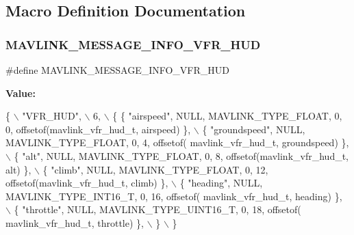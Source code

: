 \subsection{Macro Definition Documentation}
\mbox{\label{mavlink__msg__vfr__hud_8h_a8a7cc6c6a8cd28510b200a8cb401501c}} 
\subsubsection{M\+A\+V\+L\+I\+N\+K\+\_\+\+M\+E\+S\+S\+A\+G\+E\+\_\+\+I\+N\+F\+O\+\_\+\+V\+F\+R\+\_\+\+H\+UD}
{\footnotesize\ttfamily \#define M\+A\+V\+L\+I\+N\+K\+\_\+\+M\+E\+S\+S\+A\+G\+E\+\_\+\+I\+N\+F\+O\+\_\+\+V\+F\+R\+\_\+\+H\+UD}

{\bfseries Value\+:}
\begin{DoxyCode}
\{ \(\backslash\)
    \textcolor{stringliteral}{"VFR\_HUD"}, \(\backslash\)
    6, \(\backslash\)
    \{  \{ \textcolor{stringliteral}{"airspeed"}, NULL, MAVLINK_TYPE_FLOAT, 0, 0, offsetof(mavlink_vfr_hud_t, airspeed) \}, \(\backslash\)
         \{ \textcolor{stringliteral}{"groundspeed"}, NULL, MAVLINK_TYPE_FLOAT, 0, 4, offsetof(
      mavlink_vfr_hud_t, groundspeed) \}, \(\backslash\)
         \{ \textcolor{stringliteral}{"alt"}, NULL, MAVLINK_TYPE_FLOAT, 0, 8, offsetof(mavlink_vfr_hud_t, alt) \}, \(\backslash\)
         \{ \textcolor{stringliteral}{"climb"}, NULL, MAVLINK_TYPE_FLOAT, 0, 12, offsetof(mavlink_vfr_hud_t, climb) \}, \(\backslash\)
         \{ \textcolor{stringliteral}{"heading"}, NULL, MAVLINK_TYPE_INT16_T, 0, 16, offsetof(
      mavlink_vfr_hud_t, heading) \}, \(\backslash\)
         \{ \textcolor{stringliteral}{"throttle"}, NULL, MAVLINK_TYPE_UINT16_T, 0, 18, offsetof(
      mavlink_vfr_hud_t, throttle) \}, \(\backslash\)
         \} \(\backslash\)
\}
\end{DoxyCode}
\mbox{\label{mavlink__msg__vfr__hud_8h_ab0036757fd85dc4a7047d63b9f2175de}} 
